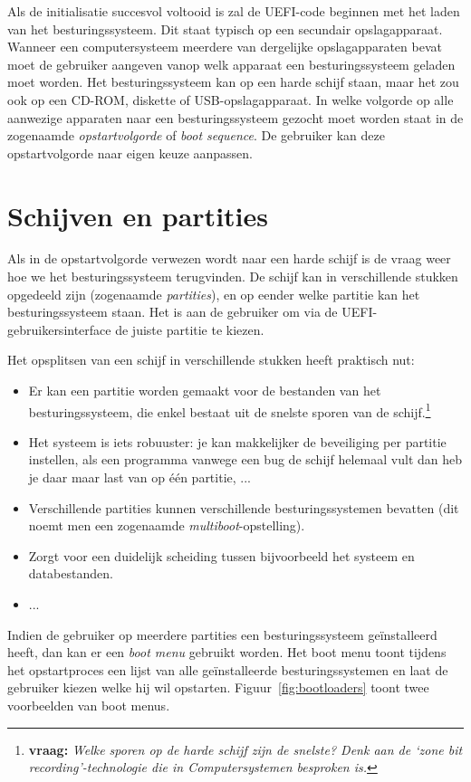 Als de initialisatie succesvol voltooid is zal de UEFI-code beginnen met
het laden van het besturingssysteem. Dit staat typisch op een
secundair opslagapparaat. Wanneer een computersysteem meerdere van
dergelijke opslagapparaten bevat moet de gebruiker aangeven vanop
welk apparaat een besturingssysteem geladen moet worden. Het
besturingssysteem kan op een harde schijf staan, maar het zou ook op
een CD-ROM, diskette of USB-opslagapparaat. In welke volgorde op alle
aanwezige apparaten naar een besturingssysteem gezocht moet worden
staat in de zogenaamde \emph{opstartvolgorde} of
\emph{boot sequence}. De gebruiker kan deze opstartvolgorde naar eigen keuze aanpassen.

\section{Schijven en partities}

Als in de opstartvolgorde verwezen wordt naar een harde schijf
is de vraag weer hoe we het besturingssysteem terugvinden. De schijf kan in verschillende stukken
opgedeeld zijn (zogenaamde \emph{partities}), en op eender welke partitie kan het besturingssysteem staan.
Het is aan de gebruiker om via de UEFI-gebruikersinterface de juiste partitie te kiezen.

Het opsplitsen van een schijf in verschillende stukken heeft praktisch nut:
\begin{itemize}
\item Er kan een partitie worden gemaakt voor de bestanden van het besturingssysteem, die enkel bestaat uit de snelste sporen van de schijf.\footnote{\textbf{vraag:} \emph{Welke sporen op de harde schijf zijn de snelste? Denk aan de `zone bit recording'-technologie die in Computersystemen besproken is.}}
\item Het systeem is iets robuuster: je kan makkelijker de beveiliging per partitie instellen, als een programma vanwege een bug de schijf helemaal vult dan heb je daar maar last van op \'e\'en partitie, ...
\item Verschillende partities kunnen verschillende besturingssystemen bevatten (dit noemt men een zogenaamde \emph{multiboot}-opstelling).
\item Zorgt voor een duidelijk scheiding tussen bijvoorbeeld het systeem en databestanden.
\item ...
\end{itemize}

Indien de gebruiker op meerdere partities een besturingssysteem ge\"installeerd heeft, dan kan er een
\emph{boot menu} gebruikt worden. Het boot menu toont tijdens het opstartproces een lijst van alle
ge\"installeerde besturingssystemen en laat de gebruiker kiezen welke hij wil opstarten. Figuur~\ref{fig:bootloaders}
toont twee voorbeelden van boot menus.

